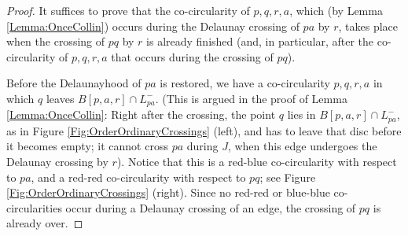 \documentclass[letter,11pt]{article}
\def \L{{L}}
\begin{document}
\begin{proof}
It suffices to prove that the co-circularity of $p,q,r,a$, which (by Lemma \ref{Lemma:OnceCollin}) occurs during the Delaunay crossing of $pa$ by $r$, takes place when the crossing of $pq$ by $r$ is already finished (and, in particular, after the co-circularity of $p,q,r,a$ that occurs during the crossing of $pq$). 

Before the Delaunayhood of $pa$ is restored, we have a co-circularity $p,q,r,a$ in which $q$ leaves $B[p,a,r]\cap \L_{pa}^-$. (This is argued in the proof of Lemma \ref{Lemma:OnceCollin}: Right after the crossing, the point $q$ lies in $B[p,a,r]\cap \L_{pa}^-$, as in Figure \ref{Fig:OrderOrdinaryCrossings} (left), and has to leave that disc before it becomes empty; it cannot cross $pa$ during $J$, when this edge undergoes the Delaunay crossing by $r$). Notice that this is a red-blue co-circularity with respect to $pa$, and a red-red co-circularity with respect to $pq$; see Figure \ref{Fig:OrderOrdinaryCrossings} (right). Since no red-red or blue-blue co-circularities occur during a Delaunay crossing of an edge, the crossing of $pq$ is already over.
\end{proof}
\end{document}
